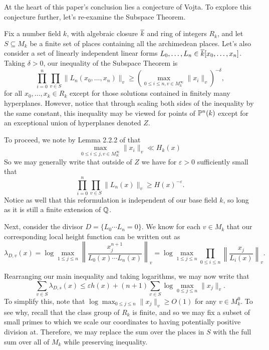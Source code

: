 At the heart of this paper's conclusion lies a conjecture of Vojta.
To explore this conjecture further, 
let's re-examine the Subspace Theorem.

Fix a number field $k$, with algebraic closure $\overline{k}$ and ring of integers $R_k$,
and let $S \subseteq M_k$ be a finite set of places containing all the archimedean places.
Let's also consider a set of linearly independent linear forms $L_0, \ldots, L_n \in \overline{k}[x_0, \ldots, x_n]$.
Taking $\delta > 0$, our inequality of the Subspace Theorem is
\[
    \prod_{i = 0}^{n} \prod_{v \in S} \|L_n(x_0, \ldots, x_n)\|_v
    \geq (\max_{0 \leq i \leq n, v \in M_k^\infty} \|x_i\|_v)^{-\delta},
\]
for all $x_0, \ldots, x_k \in R_k$ except for those solutions contained in finitely many hyperplanes.
However, notice that through scaling both sides of the inequality by the same constant, 
this inequality may be viewed for points of $\mathbb{P}^n(k)$ except for an exceptional union of hyperplanes denoted $Z$.

To proceed, we note by Lemma 2.2.2 of \cite{Vojta_2006} that 
\[
    \max_{0 \leq i \leq j, v \in M_K^\infty} \|x_i\|_v
    \ll H_k(x)
\]
So we may generally write that outside of $Z$ we have for $\varepsilon > 0$ sufficiently small that
\[
    \prod_{i = 0}^{n} \prod_{v \in S} \|L_n(x)\|_v
    \geq H(x)^{-\varepsilon}.
\]
Notice as well that this reformulation is independent of our base field $k$,
so long as it is still a finite extension of $\mathbb{Q}$.

Next, consider the divisor $D = \{ L_0 \cdots L_n = 0 \}$.
We know for each $v \in M_k$ that our corresponding local height function can be written out as
\[
    \lambda_{D,v}(x)
    = \log \max_{1 \leq j \leq n}\left\|
        \frac{x_j^{n + 1}}{L_0(x) \cdots L_n(x)}
    \right\|_v
    = \log \max_{1 \leq j \leq n} \prod_{0 \leq i \leq n} \left\|
        \frac{x_j}{L_i(x)}
    \right\|_v.
\]

Rearranging our main inequality and taking logarithms,
we may now write that
\[
    \sum_{v \in S} \lambda_{D,s}(x)
    \leq \varepsilon h(x) + (n + 1)\sum_{v \in S} \log \max_{0 \leq j \leq n} \|x_j\|_v.
\]
To simplify this, note that $\log \max_{0 \leq j \leq n} \|x_j\|_v \geq O(1)$ for any $v \in M_k^0$.
To see why, 
recall that the class group of $R_k$ is finite,
and so we may fix a subset of small primes to which we scale our coordinates to having potentially positive division at.
Therefore, we may replace the sum over the places in $S$ with the full sum over all of $M_k$ while preserving inequality.

